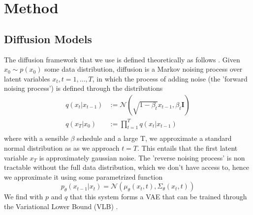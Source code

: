 \section{Method}

\subsection{Diffusion Models}
\label{sec:diffusion_models}
The diffusion framework that we use is defined theoretically as follows \cite{ddpm,improved_diffusion,EDGE}. Given $x_0 \sim p(x_0)$ some data distribution, diffusion is a Markov noising process over latent variables $x_t, t=1,...,T$, in which the process of adding noise (the 'forward noising process') is defined through the distributions
\begin{equation}
    \begin{aligned}
        q(x_t|x_{t-1}) &:= \mathcal{N}(\sqrt{1-\beta_t} x_{t-1}, \beta_t \mathbf{I}) \\
        q(x_T | x_0) &:= \prod_{t=1}^T q(x_t | x_{t-1}) \\
    \end{aligned}
\end{equation}
where with a sensible $\beta$ schedule  and a large T, we approximate a standard normal distribution as as we approach $t=T$. This entails that the first latent variable $x_T$ is approximately gaussian noise. The 'reverse noising process' is non tractable without the full data distribution, which we don't have access to, hence we approximate it using some parametrized function
\begin{equation}
    p_{\theta}(x_{t-1} | x_t) = \mathcal{N}(\mu_{\theta}(x_t, t), \Sigma_{\theta}(x_t, t))
\end{equation}
We find with $p$ and $q$ that this system forms a VAE that can be trained through the Variational Lower Bound (VLB) \cite{kingma2022_VAE}.




